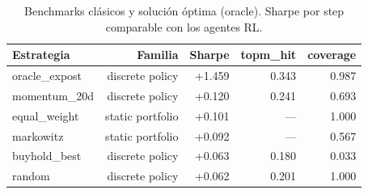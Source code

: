 \begin{table}[H]
\centering
\small
\caption{Benchmarks clásicos y solución óptima (oracle). Sharpe por step comparable con los agentes RL.}
\label{tab:tabla_benchmarks}
\begin{tabular}{lrrrr}
\toprule
Estrategia & Familia & Sharpe & topm\_hit & coverage \\
\midrule
oracle\_expost & discrete policy & +1.459 & 0.343 & 0.987 \\
momentum\_20d & discrete policy & +0.120 & 0.241 & 0.693 \\
equal\_weight & static portfolio & +0.101 & — & 1.000 \\
markowitz & static portfolio & +0.092 & — & 0.567 \\
buyhold\_best & discrete policy & +0.063 & 0.180 & 0.033 \\
random & discrete policy & +0.062 & 0.201 & 1.000 \\
\bottomrule
\end{tabular}
\end{table}
